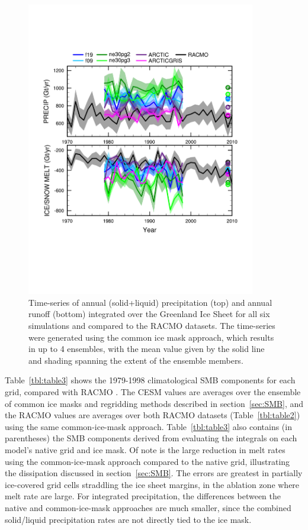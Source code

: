 \documentclass[draft]{agujournal2019}
\begin{document}
\begin{figure}[t]
\begin{center}
         \includegraphics[width=100mm]{figs/temp_tseries_GRIS.pdf}
\end{center}
\caption{Time-series of annual (solid+liquid) precipitation (top) and annual runoff (bottom) integrated over the Greenland Ice Sheet for all six simulations and compared to the RACMO datasets. The time-series were generated using the common ice mask approach, which results in up to 4 ensembles, with the mean value given by the solid line and shading spanning the extent of the ensemble members.}
\label{fig:tseries}
\end{figure}

Table~\ref{tbl:table3} shows the 1979-1998 climatological SMB components for each grid, compared with RACMO {\color{purple}{Andrew - do you want to talk about the values at all?}}.
The CESM values are averages over the ensemble of common ice masks and regridding methods described in section~\ref{sec:SMB}, and the RACMO values are averages over both RACMO datasets (Table~\ref{tbl:table2}) using the same common-ice-mask approach. Table~\ref{tbl:table3} also contains (in parentheses) the SMB components derived from evaluating the integrals on each model's native grid and ice mask. Of note is the large reduction in melt rates using the common-ice-mask approach compared to the native grid, illustrating the dissipation discussed in section~\ref{sec:SMB}. The errors are greatest in partially ice-covered grid cells straddling the ice sheet margins, in the ablation zone where melt rate are large. For integrated precipitation, the differences between the native and common-ice-mask approaches are much smaller, since the combined solid/liquid precipitation rates are not directly tied to the ice mask.
\end{document}
